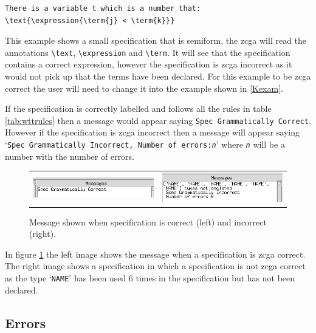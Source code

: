 \begin{exam}
\begin{verbatim}
There is a variable t which is a number that:
\text{\expression{\term{j} < \term{k}}}
\end{verbatim}
\end{exam}

This example shows a small specification that is \gls{semiform}, the \gls{zcga}
will read the annotations \verb|\text|, \verb|\expression| and \verb|\term|. It
will see that the specification contains a correct expression, however the
specification is \gls{zcga} incorrect as it would not pick up that the terms
have been declared. For this example to be \gls{zcga} correct the user will need
to change it into the example shown in \ref{Kexam}.

If the specification is correctly labelled and follows all the rules in table
\ref{tab:wttrules} then a message would appear saying \texttt{Spec Grammatically
Correct}. However if the specification is \gls{zcga} incorrect then a message
will appear saying `\texttt{Spec Grammatically Incorrect, Number of
errors:\emph{n}}' where \texttt{\emph{n}} will be a number with the number of
errors.

\begin{figure}[H]
\begin{tabular}{c c}
\includegraphics[scale=0.55]{Figures/zcga/zcgacorrect.png} 
& \includegraphics[scale=0.55]{Figures/zcga/zcgaincorrect.png}
\end{tabular}
\caption{Message shown when specification is correct (left) and incorrect (right).\label{fig:correctandincorrect}}
\end{figure}

In figure \ref{fig:correctandincorrect} the left image shows the message when a
specification is \gls{zcga} correct. The right image shows a specification in
which a specification is not \gls{zcga} correct as the type `\texttt{NAME}' has
been used 6 times in the specification but has not been declared.

\subsection{Errors}
\label{subsec:zcgaerrors}

